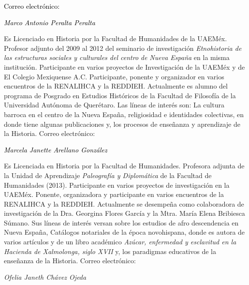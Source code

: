 { 
\textcolor{black}{Correo electrónico:}\textit{\textcolor{black}{
}}\href{mailto:angelemiliano0724@hotmail.com}{\textstyleInternetlink{\textcolor[rgb]{0.0,0.0,0.8}{angelemiliano0724@hotmail.com}}}}


\bigskip

{ 
\textit{\textcolor{black}{Marco Antonio Peralta Peralta}}}

{ 
Es Licenciado en Historia por la Facultad de Humanidades de la UAEMéx.
Profesor adjunto del 2009 al 2012 del seminario de investigación
\textit{Etnohistoria de las estructuras sociales y culturales del centro
}\textit{de Nueva España} en la misma institución. Participante en varios
proyectos de Investigación de la UAEMéx y de El Colegio Mexiquense A.C.
Participante, ponente y organizador en varios encuentros de la RENALIHCA y
la REDDIEH. Actualmente es alumno del programa de Posgrado en Estudios
Históricos de la Facultad de Filosofía de la Universidad Autónoma de
Querétaro. Las líneas de interés son: La cultura barroca en el centro de la
Nueva España, religiosidad e identidades colectivas, en donde tiene algunas
publicaciones y, los procesos de enseñanza y aprendizaje de la Historia.
Correo electrónico:
\href{mailto:marco_p1017@hotmail.com}{}}


\bigskip

{ 
\textit{\textcolor{black}{Marcela Janette Arellano González}}}

{ 
Es Licenciada en Historia por la Facultad de Humanidades.\textit{ }Profesora
adjunta de la Unidad de Aprendizaje \textit{Paleografía y Diplomática} de
la Facultad de Humanidades (2013). Participante en varios proyectos de
investigación en la UAEMéx. Ponente, organizadora y participante en varios
encuentros de la RENALIHCA y la REDDIEH. Actualmente se desempeña como
colaboradora de investigación de la Dra. Georgina Flores García y la Mtra.
María Elena Bribiesca Súmano. Sus líneas de interés versan sobre los
estudios de afro descendencia en Nueva España, Catálogos notariales de la
época novohispana, donde es autora de varios artículos y de un libro
académico \textit{Azúcar, enfermedad y esclavitud en la Hacienda de
Xalmolonga, siglo XVII} y, los paradigmas educativos de la enseñanza de la
Historia. Correo electrónico: 
\href{mailto:marboreanaz@hotmail.com}{}}


\bigskip


\bigskip

{ 
\textit{Ofelia Janeth Chávez Ojeda}}

